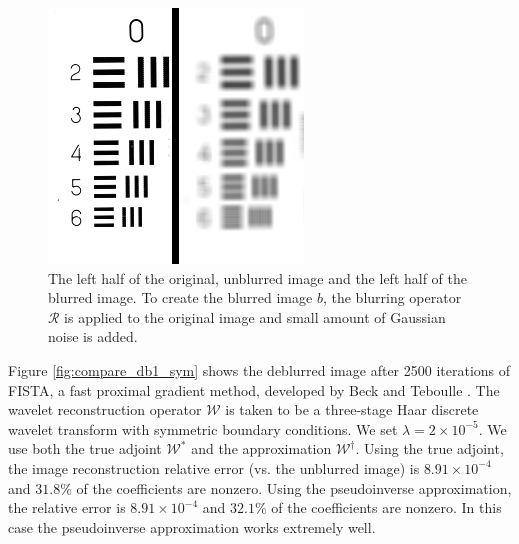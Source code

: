 \documentclass[journal]{IEEEtran}
\begin{document}
\begin{figure}
   \centering
   \includegraphics[width=0.8\columnwidth]{figures/resolution_blurred_figure.png}
   \caption{The left half of the original, unblurred image and the left half of the blurred image.  To create the blurred image $b$, the blurring operator $\mathcal{R}$ is applied to the original image and small amount of Gaussian noise is added.}
   \label{fig:original}
\end{figure}

Figure \ref{fig:compare_db1_sym} shows the deblurred image after 2500 iterations of FISTA, a fast proximal gradient method, developed by Beck and Teboulle \cite{beck_2009}.  The wavelet reconstruction operator $\mathcal{W}$ is taken to be a three-stage Haar discrete wavelet transform with symmetric boundary conditions.  We set $\lambda=2\times 10^{-5}$.  We use both the true adjoint $\mathcal{W}^\ast$ and the approximation $\mathcal{W}^\dagger$.  Using the true adjoint, the image reconstruction relative error (vs. the unblurred image) is $8.91\times10^{-4}$ and $31.8\%$ of the coefficients are nonzero.  Using the pseudoinverse approximation, the relative error is $8.91\times 10^{-4}$ and $32.1\%$ of the coefficients are nonzero.  In this case the pseudoinverse approximation works extremely well.
\end{document}
